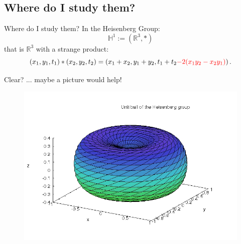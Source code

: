 \documentclass[serif]{beamer}
\theoremstyle{definition}
\begin{document}

\subsection{Where do I study them?}
\begin{frame}{Where do I study them?}
In the Heisenberg Group:
$$
\mathbb{H}^1:= ( \mathbb{R}^3, * )
$$
that is $\mathbb{R}^3$ with a strange product:
$$
(x_1,y_1,t_1)*(x_2,y_2,t_2) = \left (x_1+x_2,y_1+y_2,t_1+t_2 \textcolor{red}{-2 (x_1y_2-x_2y_1)} \right ).
$$
\end{frame}



\begin{frame}{Clear? ... maybe a picture would help!}
\begin{figure}
\centering
\includegraphics[width= 10 cm]{heisball.jpg}
\end{figure}
\end{frame}

\end{document}
